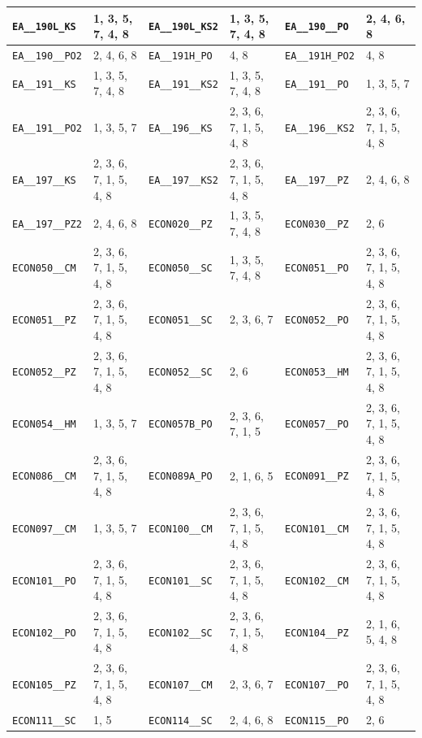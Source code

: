 \begin{longtable}{|l|l||l|l||l|l|}
    \verb|EA__190L_KS| & 1, 3, 5, 7, 4, 8 & \verb|EA__190L_KS2| & 1, 3, 5, 7, 4, 8 & \verb|EA__190__PO| & 2, 4, 6, 8\\\hline
    \verb|EA__190__PO2| & 2, 4, 6, 8 & \verb|EA__191H_PO| & 4, 8 & \verb|EA__191H_PO2| & 4, 8\\\hline
    \verb|EA__191__KS| & 1, 3, 5, 7, 4, 8 & \verb|EA__191__KS2| & 1, 3, 5, 7, 4, 8 & \verb|EA__191__PO| & 1, 3, 5, 7\\\hline
    \verb|EA__191__PO2| & 1, 3, 5, 7 & \verb|EA__196__KS| & 2, 3, 6, 7, 1, 5, 4, 8 & \verb|EA__196__KS2| & 2, 3, 6, 7, 1, 5, 4, 8\\\hline
    \verb|EA__197__KS| & 2, 3, 6, 7, 1, 5, 4, 8 & \verb|EA__197__KS2| & 2, 3, 6, 7, 1, 5, 4, 8 & \verb|EA__197__PZ| & 2, 4, 6, 8\\\hline
    \verb|EA__197__PZ2| & 2, 4, 6, 8 & \verb|ECON020__PZ| & 1, 3, 5, 7, 4, 8 & \verb|ECON030__PZ| & 2, 6\\\hline
    \verb|ECON050__CM| & 2, 3, 6, 7, 1, 5, 4, 8 & \verb|ECON050__SC| & 1, 3, 5, 7, 4, 8 & \verb|ECON051__PO| & 2, 3, 6, 7, 1, 5, 4, 8\\\hline
    \verb|ECON051__PZ| & 2, 3, 6, 7, 1, 5, 4, 8 & \verb|ECON051__SC| & 2, 3, 6, 7 & \verb|ECON052__PO| & 2, 3, 6, 7, 1, 5, 4, 8\\\hline
    \verb|ECON052__PZ| & 2, 3, 6, 7, 1, 5, 4, 8 & \verb|ECON052__SC| & 2, 6 & \verb|ECON053__HM| & 2, 3, 6, 7, 1, 5, 4, 8\\\hline
    \verb|ECON054__HM| & 1, 3, 5, 7 & \verb|ECON057B_PO| & 2, 3, 6, 7, 1, 5 & \verb|ECON057__PO| & 2, 3, 6, 7, 1, 5, 4, 8\\\hline
    \verb|ECON086__CM| & 2, 3, 6, 7, 1, 5, 4, 8 & \verb|ECON089A_PO| & 2, 1, 6, 5 & \verb|ECON091__PZ| & 2, 3, 6, 7, 1, 5, 4, 8\\\hline
    \verb|ECON097__CM| & 1, 3, 5, 7 & \verb|ECON100__CM| & 2, 3, 6, 7, 1, 5, 4, 8 & \verb|ECON101__CM| & 2, 3, 6, 7, 1, 5, 4, 8\\\hline
    \verb|ECON101__PO| & 2, 3, 6, 7, 1, 5, 4, 8 & \verb|ECON101__SC| & 2, 3, 6, 7, 1, 5, 4, 8 & \verb|ECON102__CM| & 2, 3, 6, 7, 1, 5, 4, 8\\\hline
    \verb|ECON102__PO| & 2, 3, 6, 7, 1, 5, 4, 8 & \verb|ECON102__SC| & 2, 3, 6, 7, 1, 5, 4, 8 & \verb|ECON104__PZ| & 2, 1, 6, 5, 4, 8\\\hline
    \verb|ECON105__PZ| & 2, 3, 6, 7, 1, 5, 4, 8 & \verb|ECON107__CM| & 2, 3, 6, 7 & \verb|ECON107__PO| & 2, 3, 6, 7, 1, 5, 4, 8\\\hline
    \verb|ECON111__SC| & 1, 5 & \verb|ECON114__SC| & 2, 4, 6, 8 & \verb|ECON115__PO| & 2, 6\\\hline

\end{longtable}
